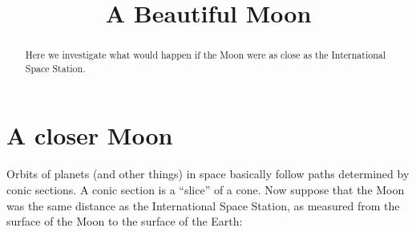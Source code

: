\documentclass{ximera}
\title[Epilogue:]{A Beautiful Moon}
\begin{document}
\begin{abstract}
Here we investigate what would happen if the Moon were as close as the
International Space Station.
\end{abstract}
\maketitle

\section{A closer Moon}

Orbits of planets (and other things) in space basically follow paths
determined by conic sections. A conic section is a ``slice'' of a
cone. Now suppose that the Moon was the same distance as the International
Space Station, as measured from the surface of the Moon to the surface
of the Earth: 
\end{document}
